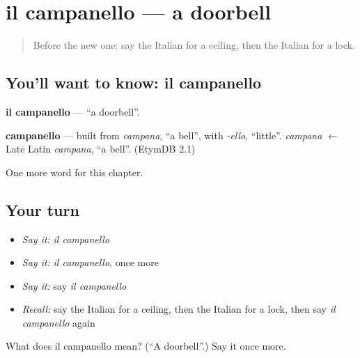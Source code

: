 \section[il campanello]{il campanello — a doorbell}

\label{lesson:IT-C191-campanello}



\begin{quote}
Before the new one: say the Italian for a ceiling, then the Italian for a lock.
\end{quote}

\subsection*{You'll want to know: il campanello}
\textbf{il campanello} — \textquotedblleft{}a doorbell\textquotedblright{}.

\begin{cousinweb}
\textbf{campanello} — built from \emph{campana}, \textquotedblleft{}a bell\textquotedblright{}, with \emph{-ello}, \textquotedblleft{}little\textquotedblright{}. \emph{campana} $\leftarrow$ Late Latin \emph{campana}, \textquotedblleft{}a bell\textquotedblright{}. (EtymDB 2.1)
\end{cousinweb}

\begin{grammarlens}[title={What you've built}]
One more word for this chapter.
\end{grammarlens}

\subsection*{Your turn}
\begin{itemize}
\raggedright
  \item \emph{Say it:} \emph{il campanello}
  \item \emph{Say it:} \emph{il campanello}, once more
  \item \emph{Say it:} say \emph{il campanello}
  \item \emph{Recall:} say the Italian for a ceiling, then the Italian for a lock, then say \emph{il campanello} again
\end{itemize}

\begin{tcolorbox}[breakable,colback=teal!4,colframe=teal!35!black,title={Before you move on}]
What does il campanello mean? (\textquotedblleft{}A doorbell\textquotedblright{}.) Say it once more.
\end{tcolorbox}

